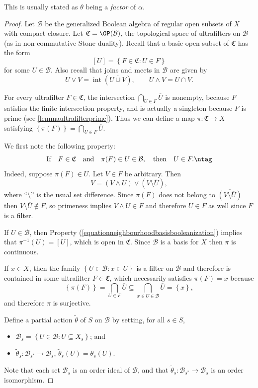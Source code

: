 This is usually stated as $\theta$ being a \emph{factor} of $\alpha$.

\begin{proof}
Let $\mathcal{B}$ be the generalized Boolean algebra of regular open subsets of $X$ with compact closure. Let $\mathfrak{C}=\GP(\mathcal{B})$, the topological space of ultrafilters on $\mathcal{B}$ (as in non-commutative Stone duality). Recall that a basic open subset of $\mathfrak{C}$ has the form
\[[U]=\left\{F\in\mathfrak{C}:U\in F\right\}\]
for some $U\in\mathcal{B}$. Also recall that joins and meets in $\mathcal{B}$ are given by
\[U\lor V=\operatorname{int}(\overline{U\cup V}),\qquad U\land V=U\cap V.\]

For every ultrafilter $F\in\mathfrak{C}$, the intersection $\bigcap_{U\in F}\overline{U}$ is nonempty, because $F$ satisfies the finite intersection property, and is actually a singleton because $F$ is prime (see \ref{lemmaultrafilterprime}). Thus we can define a map $\pi:\mathfrak{C}\to X$ satisfying $\left\{\pi(F)\right\}=\bigcap_{U\in F}\overline{U}$.

We first note the following property:
\[\text{If}\quad F\in\mathfrak{C}\quad\text{and}\quad \pi(F)\in U\in\mathcal{B},\quad\text{then}\quad U\in F.\ntag\label{equationneighbourhoodbasisbooleanization}\]
Indeed, suppose $\pi(F)\in U$. Let $V\in F$ be arbitrary. Then
\[V=(V\land U)\lor (V\setminus \overline{U}),\]
where ``$\setminus$'' is the usual set difference. Since $\pi(F)$ does not belong to $\overline{\left(V\setminus\overline{U}\right)}$ then $V\setminus\overline{U}\not\in F$, so primeness implies $V\land U\in F$ and therefore $U\in F$ as well since $F$ is a filter.

If $U\in\mathcal{B}$, then Property (\ref{equationneighbourhoodbasisbooleanization}) implies that $\pi^{-1}(U)=[U]$, which is open in $\mathfrak{C}$. Since $\mathcal{B}$ is a basis for $X$ then $\pi$ is continuous.

If $x\in X$, then the family $\left\{U\in\mathcal{B}:x\in U\right\}$ is a filter on $\mathcal{B}$ and therefore is contained in some ultrafilter $F\in\mathfrak{C}$, which necessarily satisfies $\pi(F)=x$ because
\[\left\{\pi(F)\right\}=\bigcap_{U\in F}\overline{U}\subseteq\bigcap_{x\in U\in\mathcal{B}} \overline{U}=\left\{x\right\},\]
and therefore $\pi$ is surjective.

Define a partial action $\widetilde{\theta}$ of $S$ on $\mathcal{B}$ by setting, for all $s\in S$,
\begin{itemize}
\item $\mathcal{B}_s=\left\{U\in\mathcal{B}:U\subseteq X_s\right\}$; and 
\item $\widetilde{\theta}_s:\mathcal{B}_{s^*}\to\mathcal{B}_s$, $\widetilde{\theta}_s(U)=\theta_s(U)$.
\end{itemize}
Note that each set $\mathcal{B}_s$ is an order ideal of $\mathcal{B}$, and that $\widetilde{\theta}_s:\mathcal{B}_{s^*}\to\mathcal{B}_s$ is an order isomorphism.


\end{proof}
